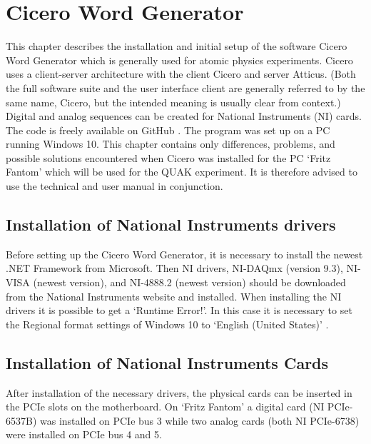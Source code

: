 
\chapter{Cicero Word Generator}\label{chap:Cicero, Cicero Word Generator}
This chapter describes the installation and initial setup of the software Cicero Word Generator \autocite{keshet2013distributed} which is generally used for atomic physics experiments. Cicero uses a client-server architecture with the client Cicero and server Atticus. (Both the full software suite and the user interface client are generally referred to by the same name, Cicero, but the intended meaning is usually clear from context.) Digital and analog sequences can be created for National Instruments (NI) cards. The code is freely available on GitHub \autocite{akeshet:Github}. The program was set up on a PC running Windows 10. This chapter contains only differences, problems, and possible solutions encountered when Cicero was installed for the PC `Fritz Fantom' which will be used for the QUAK experiment. It is therefore advised to use the technical and user manual \autocite{akeshet:manual} in conjunction.

\section{Installation of National Instruments drivers}\label{sec:Cicero, Installation of National Instruments drivers}
Before setting up the Cicero Word Generator, it is necessary to install the newest .NET Framework \autocite{microsoft:download.net} from Microsoft. Then NI drivers, NI-DAQmx (version 9.3), NI-VISA (newest version), and NI-4888.2 (newest version) should be downloaded from the National Instruments website \autocite{ni:drivers} and installed. When installing the NI drivers it is possible to get a `Runtime Error!'. In this case it is necessary to set the Regional format settings of Windows 10 to `English (United States)' \autocite{ni:runtimeerror}.

\section{Installation of National Instruments Cards}\label{sec:Cicero, Installation of National Instruments Cards}
After installation of the necessary drivers, the physical cards can be inserted in the PCIe slots on the motherboard. On `Fritz Fantom' a digital card (NI PCIe-6537B) was installed on PCIe bus 3 while two analog cards (both NI PCIe-6738) were installed on PCIe bus 4 and 5.

